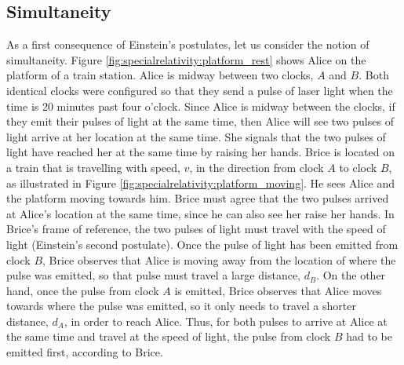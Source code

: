 \subsection{Simultaneity}
As a first consequence of Einstein's postulates, let us consider the notion of simultaneity. Figure \ref{fig:specialrelativity:platform_rest} shows Alice on the platform of a train station. Alice is midway between two clocks, $A$ and $B$. Both identical clocks were configured so that they send a pulse of laser light when the time is 20 minutes past four o'clock. Since Alice is midway between the clocks, if they emit their pulses of light at the same time, then Alice will see two pulses of light arrive at her location at the same time. She signals that the two pulses of light have reached her at the same time by raising her hands. 
Brice is located on a train that is travelling with speed, $v$, in the direction from clock $A$ to clock $B$, as illustrated in Figure \ref{fig:specialrelativity:platform_moving}. He sees Alice and the platform moving towards him. 
Brice must agree that the two pulses arrived at Alice's location at the same time, since he can also see her raise her hands. In Brice's frame of reference, the two pulses of light must travel with the speed of light (Einstein's second postulate). Once the pulse of light has been emitted from clock $B$, Brice observes that Alice is moving away from the location of where the pulse was emitted, so that pulse must travel a large distance, $d_B$. On the other hand, once the pulse from clock $A$ is emitted, Brice observes that Alice moves towards where the pulse was emitted, so it only needs to travel a shorter distance, $d_A$, in order to reach Alice. Thus, for both pulses to arrive at Alice at the same time and travel at the speed of light, the pulse from clock $B$ had to be emitted first, according to Brice.

